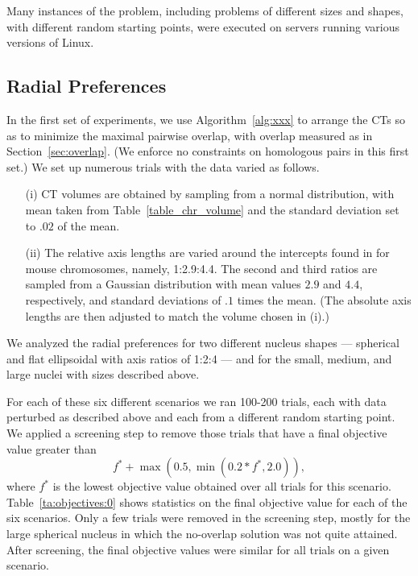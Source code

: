 \documentclass{siamltex}
\begin{document}
Many instances of the problem, including problems of different sizes
and shapes, with different random starting points, were executed on
servers running various versions of Linux.

\subsection{Radial Preferences} \label{sec:radial}

In the first set of experiments, we use Algorithm~\ref{alg:xxx} to
arrange the CTs so as to minimize the maximal pairwise overlap, with
overlap measured as in Section~\ref{sec:overlap}. (We enforce no
constraints on homologous pairs in this first set.) We set up numerous
trials with the data varied as follows.
\begin{itemize}
\item[(i)] CT volumes are obtained by sampling from a normal
  distribution, with mean taken from Table~\ref{table_chr_volume} and
  the standard deviation set to $.02$ of the mean.
\item[(ii)] The relative axis lengths are varied around the intercepts
  found in \cite{Khalil_heterologues} for mouse chromosomes, namely,
  1:2.9:4.4. The second and third ratios are sampled from a Gaussian
  distribution with mean values $2.9$ and $4.4$, respectively, and
  standard deviations of $.1$ times the mean. (The absolute axis
  lengths are then adjusted to match the volume chosen in (i).)
\end{itemize}
We analyzed the radial preferences for two different nucleus shapes
--- spherical and flat ellipsoidal with axis ratios of 1:2:4 --- and
for the small, medium, and large nuclei with sizes described above.

For each of these six different scenarios we ran 100-200 trials, each
with data perturbed as described above and each from a different
random starting point. We applied a screening step to remove those
trials that have a final objective value greater than
\[
f^* + \max  ( 0.5, \min (0.2*f^*, 2.0)),
\]
where $f^*$ is the lowest objective value obtained over all trials
for this scenario. Table~\ref{ta:objectives:0} shows statistics on the
final objective value for each of the six scenarios. Only a few trials
were removed in the screening step, mostly for the large spherical nucleus in which the no-overlap solution was not quite attained. After
screening, the final objective values were similar for all
trials on a given scenario.
\end{document}

